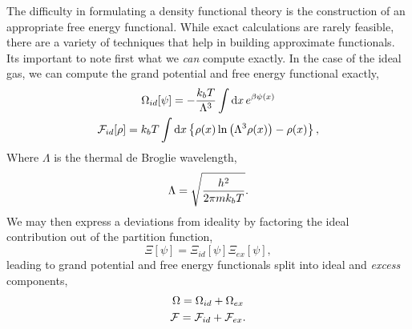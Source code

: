 The difficulty in formulating a density functional theory is the construction of an appropriate free energy functional.
While exact calculations are rarely feasible, there are a variety of techniques that help in building approximate functionals.
Its important to note first what we \textit{can} compute exactly.
In the case of the ideal gas, we can compute the grand potential and free energy functional exactly,
%
\begin{gather}
    \Omega_{id}[\psi] = -\frac{k_bT}{\Lambda^{3}}
        \int\mathrm{d}x\, e^{\beta\psi(x)} \\
    \mathcal{F}_{id}[\rho] = k_bT\int \mathrm{d}x\left\lbrace
        \rho(x) \ln\left(\Lambda^3\rho(x)\right) - \rho(x)
    \right\rbrace,
\end{gather}
% 
Where $\Lambda$ is the thermal de Broglie wavelength,
%
\begin{equation}
    \Lambda = \sqrt{\frac{h^2}{2\pi mk_bT}}.
\end{equation}
%
We may then express a deviations from ideality by factoring the ideal contribution out of the partition function,
%
\begin{equation}
    \Xi[\psi] = \Xi_{id}[\psi]\Xi_{ex}[\psi],
\end{equation}
%
leading to grand potential and free energy functionals split into ideal and \textit{excess} components,
%
\begin{gather}
    \Omega = \Omega_{id} + \Omega_{ex} \\
    \mathcal{F} = \mathcal{F}_{id} + \mathcal{F}_{ex}.
\end{gather}


